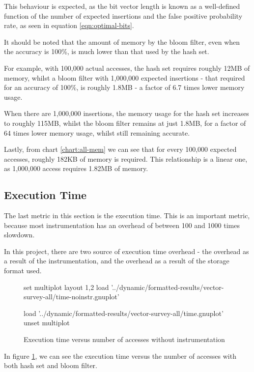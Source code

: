 	This behaviour is expected, as the bit vector length is known as a well-defined function of the number of expected insertions and the false positive probability rate, as seen in equation \ref{eqn:optimal-bits}.
	
	It should be noted that the amount of memory by the bloom filter, even when the accuracy is 100\%, is much lower than that used by the hash set.
	
	For example, with 100,000 actual accesses, the hash set requires roughly 12MB of memory, whilst a bloom filter with 1,000,000 expected insertions - that required for an accuracy of 100\%, is roughly 1.8MB - a factor of 6.7 times lower memory usage.
	
	When there are 1,000,000 insertions, the memory usage for the hash set increases to roughly 115MB, whilst the bloom filter remains at just 1.8MB, for a factor of 64 times lower memory usage, whilst still remaining accurate.
	
	Lastly, from chart \ref{chart:all-mem} we can see that for every 100,000 expected accesses, roughly 182KB of memory is required. This relationship is a linear one, as 1,000,000 access requires 1.82MB of memory.

	\subsection{Execution Time} \label{sec:results/all/time}
	The last metric in this section is the execution time. This is an important metric, because most instrumentation has an overhead of between 100 and 1000 times slowdown.
	
	In this project, there are two source of execution time overhead - the overhead as a result of the instrumentation, and the overhead as a result of the storage format used.
	
	\begin{figure}
			\centering
			\begin{gnuplot}[terminal=pdf]
			set multiplot layout 1,2
				load '../dynamic/formatted-results/vector-survey-all/time-noinstr.gnuplot'
			
				load '../dynamic/formatted-results/vector-survey-all/time.gnuplot'
			unset multiplot
			\end{gnuplot}
			\caption{Execution time versus number of accesses without instrumentation}
			\label{chart:all-time}
		\end{figure}
	
	In figure \ref{chart:all-time}, we can see the execution time versus the number of accesses with both hash set and bloom filter.
	
